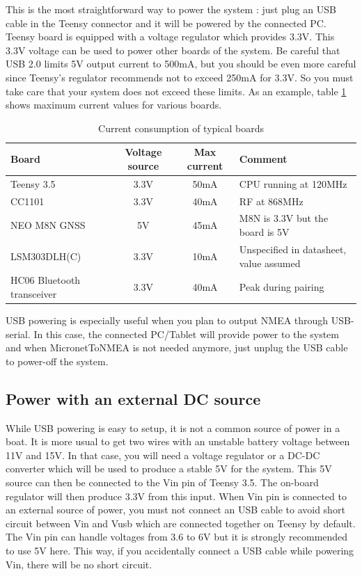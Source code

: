 \documentclass{report}
\begin{document}
This is the most straightforward way to power the system : just plug an USB cable in the Teensy connector and it will be powered by the connected PC. Teensy board is equipped with a voltage regulator which provides 3.3V. This 3.3V voltage can be used to power other boards of the system.
Be careful that USB 2.0 limits 5V output current to 500mA, but you should be even more careful since Teensy's regulator recommends not to exceed 250mA for 3.3V. So you must take care that your system does not exceed these limits.
As an example, table \ref{table:boardconsumption} shows maximum current values for various boards.

\begin{table}[h]
	\begin{tabular}{|l|c|c|l|}
		\hline
		Board & Voltage source & Max current & Comment \\
		\hline
		Teensy 3.5 & 3.3V & 50mA & CPU running at 120MHz\\
		CC1101 & 3.3V & 40mA & RF at 868MHz\\
		NEO M8N GNSS & 5V & 45mA & M8N is 3.3V but the board is 5V\\
		LSM303DLH(C) & 3.3V & 10mA & Unspecified in datasheet, value assumed\\
		HC06 Bluetooth transceiver & 3.3V & 40mA & Peak during pairing\\
		\hline
	\end{tabular}
	\caption{Current consumption of typical boards}
	\label{table:boardconsumption}
\end{table}
USB powering is especially useful when you plan to output NMEA through USB-serial. In this case, the connected PC/Tablet will provide power to the system and when MicronetToNMEA is not needed anymore, just unplug the USB cable to power-off the system.

\subsection{Power with an external DC source}
While USB powering is easy to setup, it is not a common source of power in a boat. It is more usual to get two wires with an unstable battery voltage between 11V and 15V. In that case, you will need a voltage regulator or a DC-DC converter which will be used to produce a stable 5V for the system. This 5V source can then be connected to the Vin pin of Teensy 3.5. The on-board regulator will then produce 3.3V from this input.
\linebreak
When Vin pin is connected to an external source of power, you must not connect an USB cable to avoid short circuit between Vin and Vusb which are connected together on Teensy by default. The Vin pin can handle voltages from 3.6 to 6V but it is strongly recommended to use 5V here. This way, if you accidentally connect a USB cable while powering Vin, there will be no short circuit.
\end{document}

